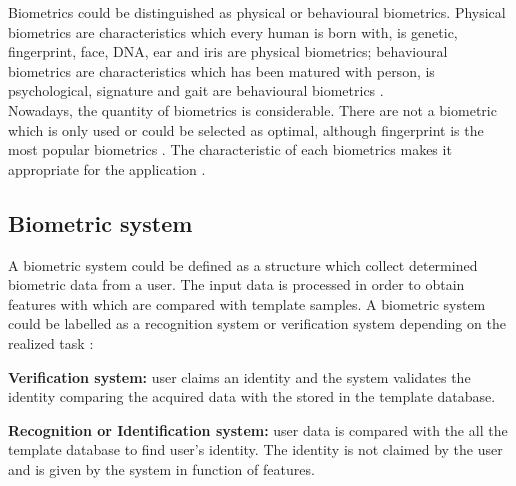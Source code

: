 Biometrics could be distinguished as physical or behavioural biometrics. Physical biometrics are characteristics which every human is born with, is genetic, fingerprint, face, DNA, ear and iris are physical biometrics; behavioural biometrics are characteristics which has been matured with person, is  psychological, signature and gait are behavioural biometrics \cite{biometrics_beha}.\\

Nowadays, the quantity of biometrics is considerable. There are not a biometric which is only used or could be selected as optimal, although fingerprint is the most popular biometrics \cite{2d_3d_face}. The characteristic of each biometrics makes it appropriate for the application \cite{Intro_biometrics}.\\%



\subsection{Biometric system}
A biometric system could be defined as a structure which collect determined biometric data from a user. The input data is processed in order to obtain features with which are compared with template samples. A biometric system could be labelled as a recognition system or verification system depending on the realized task \cite{Intro_biometrics2}:
\begin{description}[noitemsep,topsep=8pt,parsep=0pt,partopsep=20pt]
\item \textbf{Verification system:} user claims an identity and the system validates the identity comparing the acquired data with the stored in the template database.
\item \textbf{Recognition or Identification system:} user data is compared with the all the template database to find user's identity. The identity is not claimed by the user and is given by the system in function of features. 
\end{description}

